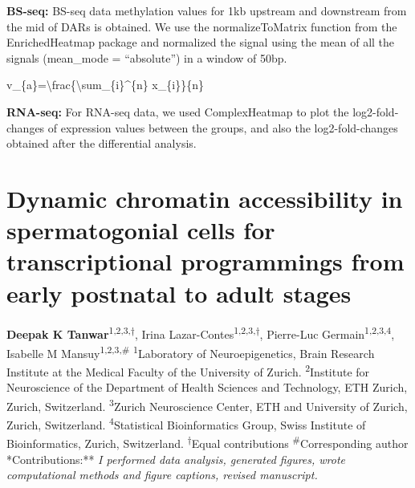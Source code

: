 \documentclass[12pt,twoside]{reedthesis}
\begin{document}
\textbf{BS-seq:} BS-seq data methylation values for 1kb upstream and downstream
from the mid of DARs is obtained. We use the normalizeToMatrix function
from the EnrichedHeatmap package and normalized the signal using the
mean of all the signals (mean\_mode = ``absolute'') in a window of 50bp.

v\_\{a\}=\textbackslash frac\{\textbackslash sum\_\{i\}\^{}\{n\} x\_\{i\}\}\{n\}

\textbf{RNA-seq:} For RNA-seq data, we used ComplexHeatmap to plot the
log2-fold-changes of expression values between the groups, and also the
log2-fold-changes obtained after the differential analysis.

\printbibliography[segment=\therefsegment,heading=subbibliography]

\hypertarget{developmental}{%
\chapter{Dynamic chromatin accessibility in spermatogonial cells for transcriptional programmings from early postnatal to adult stages}\label{developmental}}

\textbf{Deepak K Tanwar}\textsuperscript{1,2,3,$\dagger$}, Irina
Lazar-Contes\textsuperscript{1,2,3,$\dagger$}, Pierre-Luc
Germain\textsuperscript{1,2,3,4}, Isabelle M
Mansuy\textsuperscript{1,2,3,\#}\newline \newline
\textsuperscript{1}Laboratory of Neuroepigenetics, Brain Research
Institute at the Medical Faculty of the University of Zurich. \newline
\textsuperscript{2}Institute for Neuroscience of the Department of
Health Sciences and Technology, ETH Zurich, Zurich, Switzerland.\newline
\textsuperscript{3}Zurich Neuroscience Center, ETH and University of
Zurich, Zurich, Switzerland. \newline  \textsuperscript{4}Statistical
Bioinformatics Group, Swiss Institute of Bioinformatics, Zurich,
Switzerland. \newline \newline  \textsuperscript{$\dagger$}Equal
contributions \newline\newline \textsuperscript{\#}Corresponding author
\newline\newline  **Contributions:** \emph{I performed data analysis,
generated figures, wrote computational methods and figure captions,
revised manuscript.}
\end{document}
